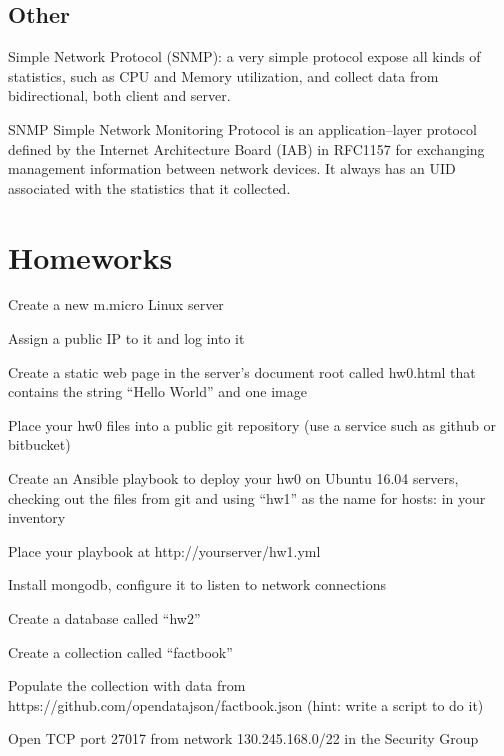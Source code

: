 \documentclass[fancy,11pt,titlestyle=display]{style/elegantbook}
\begin{document}
\section{Other}
    Simple Network Protocol (SNMP): a very simple protocol expose all kinds of statistics, such as CPU and Memory utilization, and collect data from bidirectional, both client and server.


    \begin{definition}{SNMP}{}
    Simple Network Monitoring Protocol is an application–layer protocol defined by the Internet Architecture Board (IAB) in RFC1157 for exchanging management information between network devices. It always has an UID associated with the statistics that it collected.
    \end{definition}



\chapter{Homeworks}

\begin{problemset}
	\item Create a new m.micro Linux server
    \item Assign a public IP to it and log into it
    \item Create a static web page in the server's document root called hw0.html that contains the string ``Hello World'' and one image
\end{problemset}

\begin{problemset}
    \item Place your hw0 files into a public git repository (use a service such as github or bitbucket)
    \item Create an Ansible playbook to deploy your hw0 on Ubuntu 16.04 servers, checking out the files from git and using “hw1” as the name for hosts: in your inventory
    \item Place your playbook at http://yourserver/hw1.yml
\end{problemset}

\begin{problemset}
	\item Install mongodb, configure it to listen to network connections
	\item Create a database called ``hw2''
	\item Create a collection called ``factbook''
	\item Populate the collection with data from https://github.com/opendatajson/factbook.json (hint: write a script to do it)
	\item Open TCP port 27017 from network 130.245.168.0/22 in the Security Group
\end{problemset}
\end{document}
